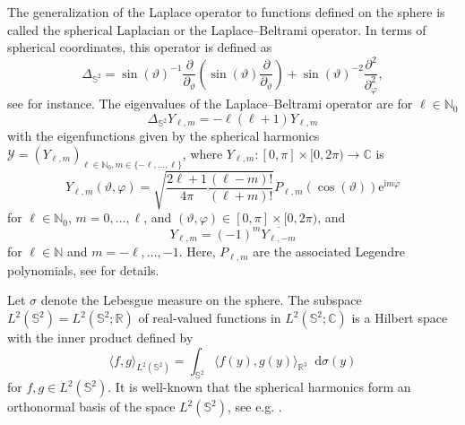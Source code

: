 \documentclass[a4paper]{amsart}
\theoremstyle{remark}
\theoremstyle{definition}
\newcommand{\N}{\mathbb{N}}
\newcommand{\IS}{\mathbb{S}}
\newcommand*\dd{\mathop{}\!\mathrm{d}}
\newcommand{\e}{\mathrm{e}}
\newcommand{\ii}{\ensuremath{\mathrm{i}}}
\begin{document}
The generalization of the Laplace operator to functions defined on the sphere is called the spherical Laplacian or the Laplace--Beltrami operator. In terms of spherical coordinates, this operator 
is defined as
$$
\Delta_{\IS^2}=\sin(\vartheta)^{-1}\frac{\partial}{ \partial_\vartheta}\left( \sin(\vartheta) \frac{\partial}{ \partial_\vartheta}\right)+\sin(\vartheta)^{-2}\frac{\partial^2}{ \partial_\varphi^2},
$$
see \cite[Section~3.4.3]{MP11} for instance. 
The eigenvalues of the Laplace--Beltrami operator are for $\ell \in \N_0$
$$
\Delta_{\IS^2} Y_{\ell,m} = -\ell(\ell+1) Y_{\ell,m}
$$
with the eigenfunctions given by the spherical harmonics $\mathcal{Y}= (Y_{\ell,m})_{\ell\in\mathbb N_0, m\in\{-\ell,\ldots,\ell\}}$, where $Y_{\ell,m}\colon[0,\pi]\times[0,2\pi) \to \mathbb C$ is 
\begin{equation*}
Y_{\ell, m}(\vartheta, \varphi)
= \sqrt{\frac{2\ell + 1}{4\pi}\frac{(\ell-m)!}{(\ell+m)!}} P_{\ell, m}(\cos(\vartheta)) \e^{\ii m\varphi}
\end{equation*}
for $\ell \in \mathbb N_0$, $m = 0,\ldots, \ell$, and $(\vartheta,\varphi) \in [0,\pi] \times [0,2\pi)$, and
\begin{equation*}
Y_{\ell, m}
= (-1)^m \overline{Y_{\ell, -m}}
\end{equation*}
for $\ell \in \mathbb N$ and $m=-\ell, \ldots,-1$. Here, $P_{\ell, m}$ are the associated Legendre polynomials, see \cite[Theorem~2.13]{M98} for details. 

Let $\sigma$ denote the Lebesgue measure on the sphere. 
The subspace $L^2(\IS^2)=L^2(\IS^2;\mathbb R)$ of real-valued functions in $L^2(\IS^2;\mathbb C)$ is a Hilbert space with the inner product defined by
\[
\langle f,g \rangle_{L^2(\IS^2)}=\int_{\IS^2} \langle f(y),g(y) \rangle_{\mathbb R^3} \dd \sigma(y)
\]
for $f,g\in L^2(\IS^2)$. It is well-known that the spherical harmonics form an orthonormal basis of the space $L^2(\IS^2)$, see e.g. \cite[Chapter 7]{Kosmann-Schwarzbach2010}. 
\end{document}
